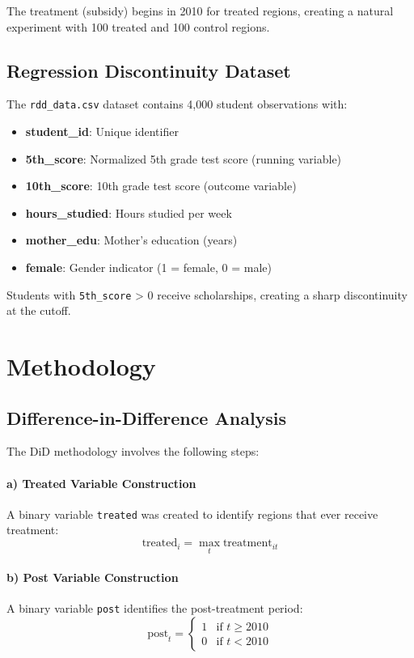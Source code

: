 \documentclass[a4paper,12pt,headsepline]{scrartcl} %
\begin{document}
The treatment (subsidy) begins in 2010 for treated regions, creating a natural experiment with 100 treated and 100 control regions.

\subsection{Regression Discontinuity Dataset}
The \texttt{rdd\_data.csv} dataset contains 4,000 student observations with:
\begin{itemize}
    \item \textbf{student\_id}: Unique identifier
    \item \textbf{5th\_score}: Normalized 5th grade test score (running variable)
    \item \textbf{10th\_score}: 10th grade test score (outcome variable)
    \item \textbf{hours\_studied}: Hours studied per week
    \item \textbf{mother\_edu}: Mother's education (years)
    \item \textbf{female}: Gender indicator (1 = female, 0 = male)
\end{itemize}

Students with \texttt{5th\_score} > 0 receive scholarships, creating a sharp discontinuity at the cutoff.

\section{Methodology}

\subsection{Difference-in-Difference Analysis}

The DiD methodology involves the following steps:

\paragraph{a) Treated Variable Construction}
A binary variable \texttt{treated} was created to identify regions that ever receive treatment:
\begin{equation}
\text{treated}_i = \max_{t} \text{treatment}_{it}
\end{equation}

\paragraph{b) Post Variable Construction}
A binary variable \texttt{post} identifies the post-treatment period:
\begin{equation}
\text{post}_t = 
\begin{cases}
1 & \text{if } t \geq 2010 \\
0 & \text{if } t < 2010
\end{cases}
\end{equation}
\end{document}
